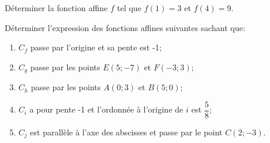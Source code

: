 \begin{exercice}
Déterminer la fonction affine $f$ tel que $f(1)=3$ et $f(4)=9$.
\end{exercice}

\begin{exercice}
Déterminer l'expression des fonctions affines suivantes sachant que:
\begin{enumerate}
\item $C_f$ passe par l'origine et sa pente est -1;
\item $C_g$ passe par les points $E(5;-7)$ et $F(-3;3)$;
\item $C_h$ passe par les points $A(0;3)$ et $B(5;0)$;
\item $C_i$ a pour pente -1 et l'ordonnée à l'origine de $i$ est $\dfrac{5}{8}$;
\item $C_j$ est parallèle à l'axe des abscisses et passe par le point $C(2;-3)$.
\end{enumerate}
\end{exercice}

